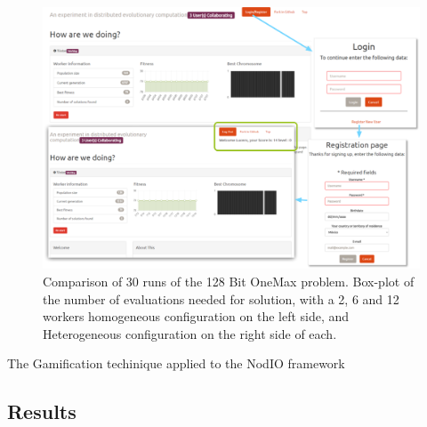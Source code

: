 \documentclass{llncs}
\begin{document}
\begin{figure}[t]
    \centering
        \includegraphics[width=5in]{img/login.png}
    \caption{Comparison of 30 runs of the 128 Bit OneMax problem. 
    Box-plot of the number of evaluations needed for solution, with a 2, 6 and 12 workers
    homogeneous configuration on the left side, and Heterogeneous configuration on the
    right side of each.
    }
    \label{fig:login}
\end{figure}

The Gamification techinique applied to the NodIO framework  

\subsection{Results}
\label{sec:results}
\end{document}
